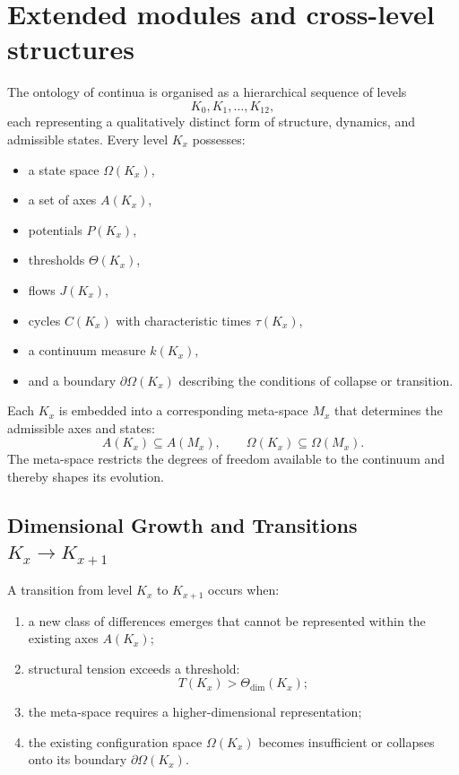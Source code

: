
\section{Extended modules and cross-level structures}
\label{sec:klevels-master}

The ontology of continua is organised as a hierarchical sequence of
levels
\[
K_0, K_1, \dots, K_{12},
\]
each representing a qualitatively distinct form of structure,
dynamics, and admissible states.
Every level $K_x$ possesses:
\begin{itemize}
    \item a state space $\Omega(K_x)$,
    \item a set of axes $A(K_x)$,
    \item potentials $P(K_x)$,
    \item thresholds $\Theta(K_x)$,
    \item flows $J(K_x)$,
    \item cycles $C(K_x)$ with characteristic times $\tau(K_x)$,
    \item a continuum measure $k(K_x)$,
    \item and a boundary $\partial\Omega(K_x)$ describing the conditions
          of collapse or transition.
\end{itemize}

Each $K_x$ is embedded into a corresponding meta-space $M_x$ that
determines the admissible axes and states:
\[
A(K_x) \subseteq A(M_x), \qquad
\Omega(K_x) \subseteq \Omega(M_x).
\]
The meta-space restricts the degrees of freedom available to the
continuum and thereby shapes its evolution.


\subsection{Dimensional Growth and Transitions $K_x \to K_{x+1}$}

A transition from level $K_x$ to $K_{x+1}$ occurs when:
\begin{enumerate}
    \item a new class of differences emerges that cannot be represented
          within the existing axes $A(K_x)$;
    \item structural tension exceeds a threshold:
    \[
        T(K_x) > \Theta_{\mathrm{dim}}(K_x);
    \]
    \item the meta-space requires a higher-dimensional representation;
    \item the existing configuration space $\Omega(K_x)$ becomes
          insufficient or collapses onto its boundary $\partial\Omega(K_x)$.
\end{enumerate}

